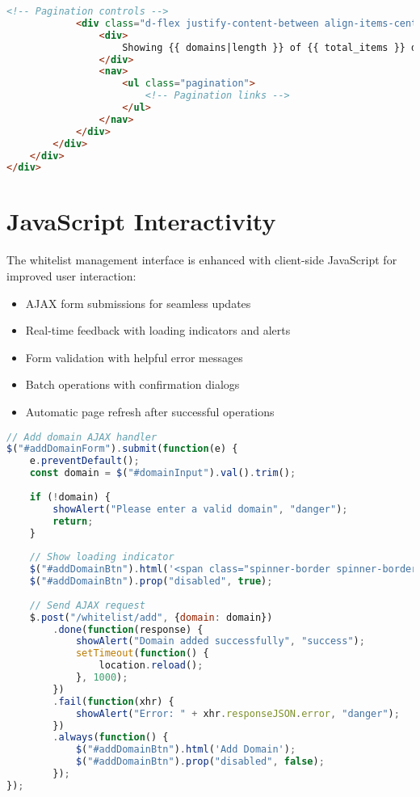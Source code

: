 \begin{lstlisting}[language=HTML, caption=Whitelist Template Excerpt]
            <!-- Pagination controls -->
            <div class="d-flex justify-content-between align-items-center mt-3">
                <div>
                    Showing {{ domains|length }} of {{ total_items }} domains
                </div>
                <nav>
                    <ul class="pagination">
                        <!-- Pagination links -->
                    </ul>
                </nav>
            </div>
        </div>
    </div>
</div>
\end{lstlisting}

\section{JavaScript Interactivity}

The whitelist management interface is enhanced with client-side JavaScript for improved user interaction:

\begin{itemize}
    \item AJAX form submissions for seamless updates
    \item Real-time feedback with loading indicators and alerts
    \item Form validation with helpful error messages
    \item Batch operations with confirmation dialogs
    \item Automatic page refresh after successful operations
\end{itemize}

\begin{lstlisting}[language=JavaScript, caption=Whitelist Management JavaScript]
// Add domain AJAX handler
$("#addDomainForm").submit(function(e) {
    e.preventDefault();
    const domain = $("#domainInput").val().trim();
    
    if (!domain) {
        showAlert("Please enter a valid domain", "danger");
        return;
    }
    
    // Show loading indicator
    $("#addDomainBtn").html('<span class="spinner-border spinner-border-sm"></span> Adding...');
    $("#addDomainBtn").prop("disabled", true);
    
    // Send AJAX request
    $.post("/whitelist/add", {domain: domain})
        .done(function(response) {
            showAlert("Domain added successfully", "success");
            setTimeout(function() {
                location.reload();
            }, 1000);
        })
        .fail(function(xhr) {
            showAlert("Error: " + xhr.responseJSON.error, "danger");
        })
        .always(function() {
            $("#addDomainBtn").html('Add Domain');
            $("#addDomainBtn").prop("disabled", false);
        });
});
\end{lstlisting}

